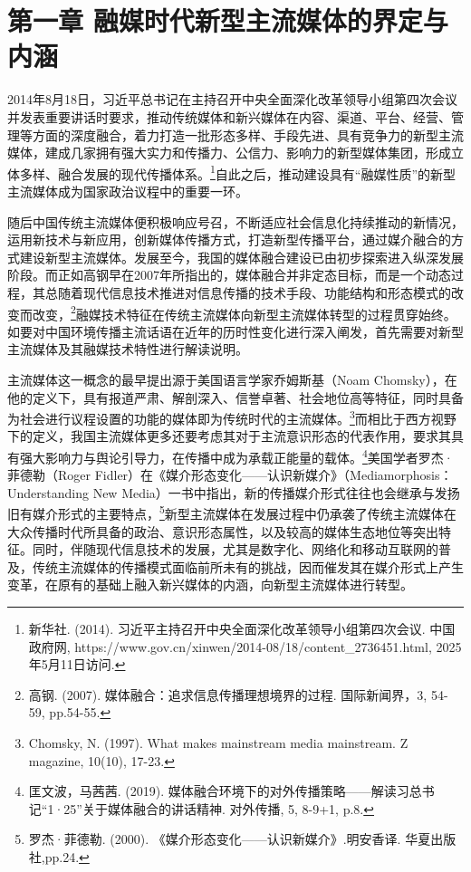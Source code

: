 \section{第一章
融媒时代新型主流媒体的界定与内涵}\label{ux7b2cux4e00ux7ae0-ux878dux5a92ux65f6ux4ee3ux65b0ux578bux4e3bux6d41ux5a92ux4f53ux7684ux754cux5b9aux4e0eux5185ux6db5}

2014年8月18日，习近平总书记在主持召开中央全面深化改革领导小组第四次会议并发表重要讲话时要求，推动传统媒体和新兴媒体在内容、渠道、平台、经营、管理等方面的深度融合，着力打造一批形态多样、手段先进、具有竞争力的新型主流媒体，建成几家拥有强大实力和传播力、公信力、影响力的新型媒体集团，形成立体多样、融合发展的现代传播体系。\footnote{新华社.
  (2014). 习近平主持召开中央全面深化改革领导小组第四次会议. 中国政府网,
  https://www.gov.cn/xinwen/2014-08/18/content\_2736451.html,
  2025年5月11日访问.}自此之后，推动建设具有``融媒性质''的新型主流媒体成为国家政治议程中的重要一环。

随后中国传统主流媒体便积极响应号召，不断适应社会信息化持续推动的新情况，运用新技术与新应用，创新媒体传播方式，打造新型传播平台，通过媒介融合的方式建设新型主流媒体。发展至今，我国的媒体融合建设已由初步探索进入纵深发展阶段。而正如高钢早在2007年所指出的，媒体融合并非定态目标，而是一个动态过程，其总随着现代信息技术推进对信息传播的技术手段、功能结构和形态模式的改变而改变，\footnote{高钢.
  (2007). 媒体融合：追求信息传播理想境界的过程. 国际新闻界，3, 54-59,
  pp.54-55.}融媒技术特征在传统主流媒体向新型主流媒体转型的过程贯穿始终。如要对中国环境传播主流话语在近年的历时性变化进行深入阐发，首先需要对新型主流媒体及其融媒技术特性进行解读说明。

主流媒体这一概念的最早提出源于美国语言学家乔姆斯基（Noam
Chomsky），在他的定义下，具有报道严肃、解剖深入、信誉卓著、社会地位高等特征，同时具备为社会进行议程设置的功能的媒体即为传统时代的主流媒体。\footnote{Chomsky,
  N. (1997). What makes mainstream media mainstream. Z magazine, 10(10),
  17-23.}而相比于西方视野下的定义，我国主流媒体更多还要考虑其对于主流意识形态的代表作用，要求其具有强大影响力与舆论引导力，在传播中成为承载正能量的载体。\footnote{匡文波，马茜茜.
  (2019).
  媒体融合环境下的对外传播策略------解读习总书记``1·25''关于媒体融合的讲话精神.
  对外传播, 5, 8-9+1, p.8.}美国学者罗杰·菲德勒（Roger
Fidler）在《媒介形态变化------认识新媒介》（Mediamorphosis：Understanding
New
Media）一书中指出，新的传播媒介形式往往也会继承与发扬旧有媒介形式的主要特点，\footnote{罗杰·菲德勒.
  (2000). 《媒介形态变化------认识新媒介》.明安香译. 华夏出版社,pp.24.}新型主流媒体在发展过程中仍承袭了传统主流媒体在大众传播时代所具备的政治、意识形态属性，以及较高的媒体生态地位等突出特征。同时，伴随现代信息技术的发展，尤其是数字化、网络化和移动互联网的普及，传统主流媒体的传播模式面临前所未有的挑战，因而催发其在媒介形式上产生变革，在原有的基础上融入新兴媒体的内涵，向新型主流媒体进行转型。

